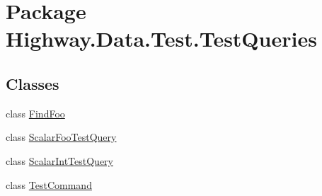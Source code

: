 \hypertarget{namespace_highway_1_1_data_1_1_test_1_1_test_queries}{\section{Package Highway.\-Data.\-Test.\-Test\-Queries}
\label{namespace_highway_1_1_data_1_1_test_1_1_test_queries}
}
\subsection*{Classes}
\begin{DoxyCompactItemize}
\item 
class \hyperlink{class_highway_1_1_data_1_1_test_1_1_test_queries_1_1_find_foo}{Find\-Foo}
\item 
class \hyperlink{class_highway_1_1_data_1_1_test_1_1_test_queries_1_1_scalar_foo_test_query}{Scalar\-Foo\-Test\-Query}
\item 
class \hyperlink{class_highway_1_1_data_1_1_test_1_1_test_queries_1_1_scalar_int_test_query}{Scalar\-Int\-Test\-Query}
\item 
class \hyperlink{class_highway_1_1_data_1_1_test_1_1_test_queries_1_1_test_command}{Test\-Command}
\end{DoxyCompactItemize}
